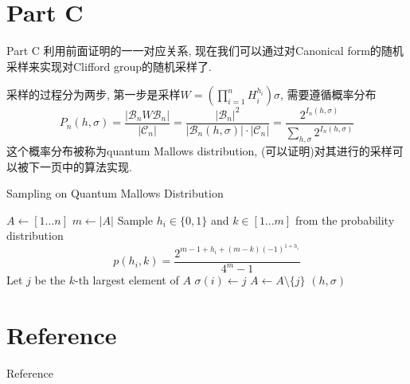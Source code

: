 \documentclass{beamer}
\begin{document}
\section{Part C}
\begin{frame}{Part C}
	利用前面证明的一一对应关系, 现在我们可以通过对Canonical form的随机采样来实现对Clifford group的随机采样了.\pause
	
	采样的过程分为两步, 第一步是采样$W= \left(\prod\limits_{i=1}^{n}H_i^{h_i}\right)\sigma$, 需要遵循概率分布	$$
	P_n(h, \sigma) = \frac{|\mathcal B_nW\mathcal B_n|}{|\mathcal C_n|} = \frac{|\mathcal B_n|^2}{|\mathcal B_n(h, \sigma)|\cdot |\mathcal C_n|} = \frac{2^{I_n(h, \sigma)}}{\sum_{h, \sigma}2^{I_n(h, \sigma)}}
	$$
	这个概率分布被称为quantum Mallows distribution, (可以证明)对其进行的采样可以被下一页中的算法实现.
\end{frame}
\begin{frame}{Sampling on Quantum Mallows Distribution}
		\begin{algorithmic}[1]
			\State $A \gets [1...n]$
			\State $m \gets |A|$
			\State Sample $h_i \in \{0, 1\}$ and $k \in [1...m]$ from the probability distribution
			$$p(h_i, k) = \frac{2^{m-1+h_i+(m-k)(-1)^{1 + h_i}}}{4^m-1}$$
			\State Let $j$ be the $k$-th largest element of $A$
			\State $\sigma(i) \gets j$
			\State $A \gets A \setminus \{j\}$
			\EndFor
			\State \Return $(h, \sigma)$
		\end{algorithmic}
\end{frame}
\section{Reference}
\begin{frame}{Reference}


\end{frame}
\end{document}
